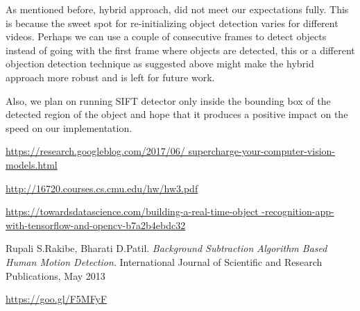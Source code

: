 \documentclass[10pt,twocolumn,letterpaper]{article}
\begin{document}
As mentioned before, hybrid approach, did not meet our expectations fully. This is because the sweet spot for re-initializing object detection varies for different videos. Perhaps we can use a couple of consecutive frames to detect objects instead of going with the first frame where objects are detected, this or a different objection detection technique as suggested above might make the hybrid approach more robust and is left for future work.

Also, we plan on running SIFT detector only inside the bounding box of the detected region of the object and hope that it produces a positive impact on the speed on our implementation.





\begin{thebibliography}{9}
\url{https://research.googleblog.com/2017/06/
supercharge-your-computer-vision-models.html}
 
\url{http://16720.courses.cs.cmu.edu/hw/hw3.pdf}
 
\url{https://towardsdatascience.com/building-a-real-time-object
-recognition-app-with-tensorflow-and-opencv-b7a2b4ebdc32}

Rupali S.Rakibe, Bharati D.Patil.
\textit{Background Subtraction Algorithm Based Human Motion Detection}. 
International Journal of Scientific and Research Publications, May 2013

\url{https://goo.gl/F5MFyF}

\end{thebibliography}





\


{\small


}
\end{document}
